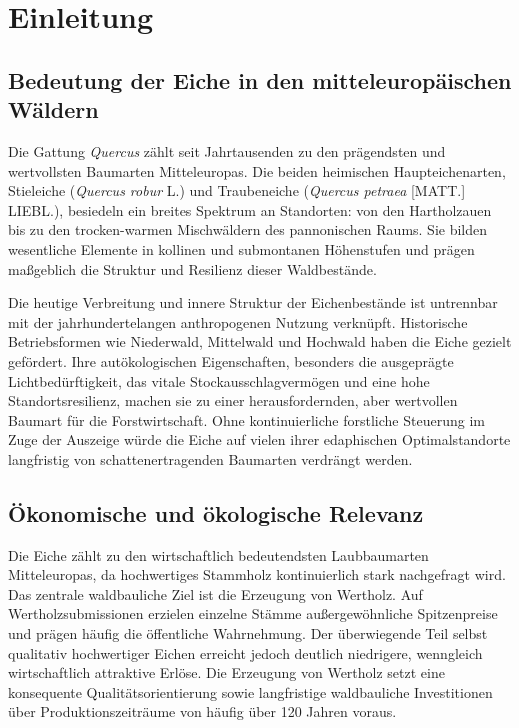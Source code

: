\documentclass[twocolumn, bibliography=totoc, abstract=true]{scrartcl}
\begin{document}
\tableofcontents

\section{Einleitung}

\subsection{Bedeutung der Eiche in den mitteleuropäischen Wäldern}

Die Gattung \textit{Quercus} zählt seit Jahrtausenden zu den prägendsten und wertvollsten Baumarten Mitteleuropas. Die beiden heimischen Haupteichenarten, Stieleiche (\textit{Quercus robur} L.) und Traubeneiche (\textit{Quercus petraea} [MATT.] LIEBL.), besiedeln ein breites Spektrum an Standorten: von den Hartholzauen bis zu den trocken-warmen Mischwäldern des pannonischen Raums. Sie bilden wesentliche Elemente in kollinen und submontanen Höhenstufen und prägen maßgeblich die Struktur und Resilienz dieser Waldbestände.

Die heutige Verbreitung und innere Struktur der Eichenbestände ist untrennbar mit der jahrhundertelangen anthropogenen Nutzung verknüpft. Historische Betriebsformen wie Niederwald, Mittelwald und Hochwald haben die Eiche gezielt gefördert. Ihre autökologischen Eigenschaften, besonders die ausgeprägte Lichtbedürftigkeit, das vitale Stockausschlagvermögen und eine hohe Standortsresilienz, machen sie zu einer herausfordernden, aber wertvollen Baumart für die Forstwirtschaft. Ohne kontinuierliche forstliche Steuerung im Zuge der Auszeige würde die Eiche auf vielen ihrer edaphischen Optimalstandorte langfristig von schattenertragenden Baumarten verdrängt werden.

\subsection{Ökonomische und ökologische Relevanz}

Die Eiche zählt zu den wirtschaftlich bedeutendsten Laubbaumarten Mitteleuropas, da hochwertiges Stammholz kontinuierlich stark nachgefragt wird. Das zentrale waldbauliche Ziel ist die Erzeugung von Wertholz. Auf Wertholzsubmissionen erzielen einzelne Stämme außergewöhnliche Spitzenpreise und prägen häufig die öffentliche Wahrnehmung. Der überwiegende Teil selbst qualitativ hochwertiger Eichen erreicht jedoch deutlich niedrigere, wenngleich wirtschaftlich attraktive Erlöse. Die Erzeugung von Wertholz setzt eine konsequente Qualitätsorientierung sowie langfristige waldbauliche Investitionen über Produktionszeiträume von häufig über 120 Jahren voraus.
\end{document}
